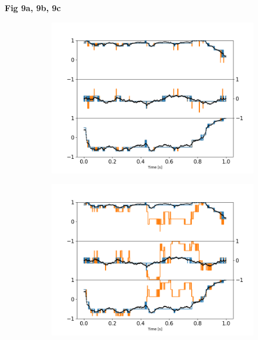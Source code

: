\documentclass[final,  3p]{elsarticle}
\begin{document}
\begin{center}
	\bf{Fig 9a, 9b, 9c}
\end{center}
\begin{figure}[h]
	\centering
	\begin{subfigure}{0.31\textwidth}
		\subcaption{}
		\includegraphics[width =\textwidth]{./Images/fig9a.png}
	\end{subfigure}
	\begin{subfigure}{0.31\textwidth}
		\subcaption{}
		\includegraphics[width=\textwidth]{./Images/fig9b.png}
	\end{subfigure}
	\begin{subfigure}{0.31\textwidth}
		\subcaption{}

\end{subfigure}
\end{figure}
\end{document}
